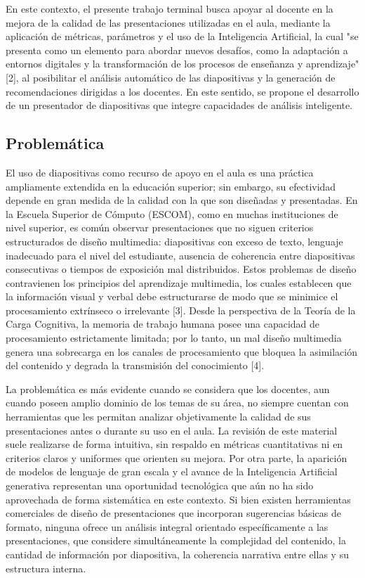 \documentclass[11pt]{article}
\begin{document}
En este contexto, el presente trabajo terminal busca apoyar al docente en la mejora de la calidad de las presentaciones utilizadas en el aula, mediante la aplicación de métricas, parámetros y el uso de la Inteligencia Artificial, la cual "se presenta como un elemento para abordar nuevos desafíos, como la adaptación a entornos digitales y la transformación de los procesos de enseñanza y aprendizaje" [2], al posibilitar el análisis automático de las diapositivas y la generación de recomendaciones dirigidas a los docentes. En este sentido, se propone el desarrollo de un presentador de diapositivas que integre capacidades de análisis inteligente.


\subsection*{Problemática}
El uso de diapositivas como recurso de apoyo en el aula es una práctica ampliamente extendida en la educación superior; sin embargo, su efectividad depende en gran medida de la calidad con la que son diseñadas y presentadas. En la Escuela Superior de Cómputo (ESCOM), como en muchas instituciones de nivel superior, es común observar presentaciones que no siguen criterios estructurados de diseño multimedia: diapositivas con exceso de texto, lenguaje inadecuado para el nivel del estudiante, ausencia de coherencia entre diapositivas consecutivas o tiempos de exposición mal distribuidos. Estos problemas de diseño contravienen los principios del aprendizaje multimedia, los cuales establecen que la información visual y verbal debe estructurarse de modo que se minimice el procesamiento extrínseco o irrelevante [3]. Desde la perspectiva de la Teoría de la Carga Cognitiva, la memoria de trabajo humana posee una capacidad de procesamiento estrictamente limitada; por lo tanto, un mal diseño multimedia genera una sobrecarga en los canales de procesamiento que bloquea la asimilación del contenido y degrada la transmisión del conocimiento [4].

La problemática es más evidente cuando se considera que los docentes, aun cuando poseen amplio dominio de los temas de su área, no siempre cuentan con herramientas que les permitan analizar objetivamente la calidad de sus presentaciones antes o durante su uso en el aula. La revisión de este material suele realizarse de forma intuitiva, sin respaldo en métricas cuantitativas ni en criterios claros y uniformes que orienten su mejora.
Por otra parte, la aparición de modelos de lenguaje de gran escala y el avance de la Inteligencia Artificial generativa representan una oportunidad tecnológica que aún no ha sido aprovechada de forma sistemática en este contexto. Si bien existen herramientas comerciales de diseño de presentaciones que incorporan sugerencias básicas de formato, ninguna ofrece un análisis integral orientado específicamente a las presentaciones, que considere simultáneamente la complejidad del contenido, la cantidad de información por diapositiva, la coherencia narrativa entre ellas y su estructura interna.
\end{document}
